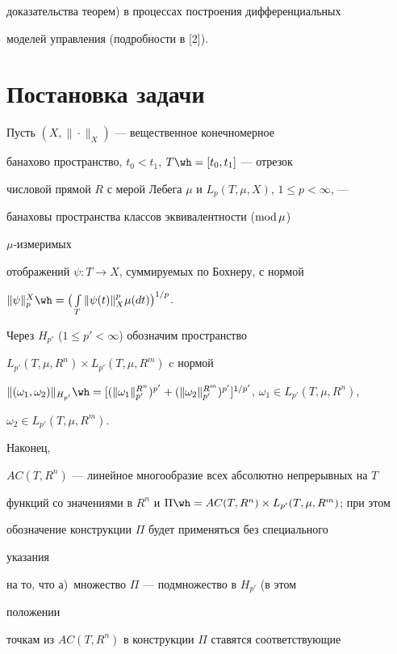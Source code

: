 доказательства теорем) в процессах построения дифференциальных 


моделей управления (подробности в [2]). 


 


\section{Постановка задачи} 


 


Пусть $(X,\|\cdot\|_X)$ --- вещественное конечномерное 


банахово пространство, $t_0<t_1$, $T\wh =[t_0,t_1]$ --- отрезок 


числовой прямой $R$ с мерой Лебега $\mu$ и $L_p(T,\mu,X)$, $1\le 


p<\infty$, --- 


банаховы пространства классов эквивалентности ($\operatorname{mod}\mu$) 


$\mu$-измеримых 


отображений $\psi:T\to X$, суммируемых по Бохнеру, с нормой 


$\|\psi\|^X_p\wh =\big(\int\limits_T\|\psi(t)\|^p_X\mu(dt)\big)^{1/p}$. 


Через $H_{p'}$ ($1\le p'<\infty$) обозначим пространство 


$L_{p'}(T,\mu,R^n)\times L_{p'}(T,\mu,R^m)$ c нормой 


$\|(\omega_1,\omega_2)\|_{H_{p'}}\wh =[(\|\omega_1\|^{R^n}_{p'})^{p'}+ 


(\|\omega_2\|^{R^m}_{p'})^{p'}]^{1/p'}$, $\omega_1\in L_{p'}(T,\mu,R^n)$, 


$\omega_2\in L_{p'}(T,\mu,R^m)$. 


Наконец, 


$AC(T,R^n)$ --- линейное многообразие всех абсолютно непрерывных на $T$ 


функций со значениями в $R^n$ и $\Pi\wh =AC(T,R^n)\times 


L_{p'}(T,\mu,R^m)$; при этом 


обозначение конструкции $\Pi$ будет применяться без специального 


указания 


на то, что а)~множество $\Pi$ --- подмножество в $H_{p'}$ (в этом 


положении 


точкам из $AC(T,R^n)$ в конструкции $\Pi$ ставятся соответствующие 



